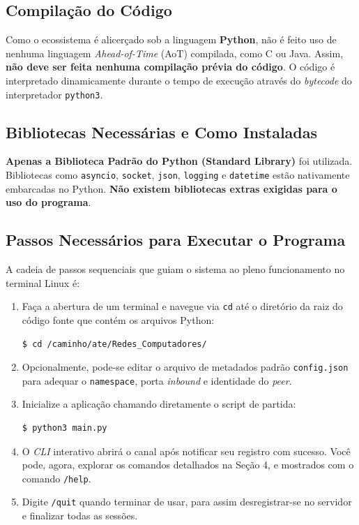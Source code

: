 \documentclass[12pt,a4paper]{article}
\begin{document}
\subsection{Compilação do Código}
Como o ecossistema é alicerçado sob a linguagem \textbf{Python}, não é feito uso de nenhuma linguagem \textit{Ahead-of-Time} (AoT) compilada, como C ou Java. Assim, \textbf{não deve ser feita nenhuma compilação prévia do código}. O código é interpretado dinamicamente durante o tempo de execução através do \textit{bytecode} do interpretador \texttt{python3}.

\subsection{Bibliotecas Necessárias e Como Instaladas}
\textbf{Apenas a Biblioteca Padrão do Python (Standard Library)} foi utilizada. Bibliotecas como \texttt{asyncio}, \texttt{socket}, \texttt{json}, \texttt{logging} e \texttt{datetime} estão nativamente embarcadas no Python. \textbf{Não existem bibliotecas extras exigidas para o uso do programa}.

\subsection{Passos Necessários para Executar o Programa}
A cadeia de passos sequenciais que guiam o sistema ao pleno funcionamento no terminal Linux é:
\begin{enumerate}
    \item Faça a abertura de um terminal e navegue via \texttt{cd} até o diretório da raiz do código fonte que contém os arquivos Python:
\begin{lstlisting}[language=bash, numbers=none]
$ cd /caminho/ate/Redes_Computadores/
\end{lstlisting}
    \item Opcionalmente, pode-se editar o arquivo de metadados padrão \texttt{config.json} para adequar o \texttt{namespace}, porta \textit{inbound} e identidade do \textit{peer}.
    \item Inicialize a aplicação chamando diretamente o script de partida:
\begin{lstlisting}[language=bash, numbers=none]
$ python3 main.py
\end{lstlisting}
    \item O \textit{CLI} interativo abrirá o canal após notificar seu registro com sucesso. Você pode, agora, explorar os comandos detalhados na Seção 4, e mostrados com o comando \texttt{/help}. 
    \item Digite \texttt{/quit} quando terminar de usar, para assim desregistrar-se no servidor e finalizar todas as sessões.
\end{enumerate}
\end{document}
